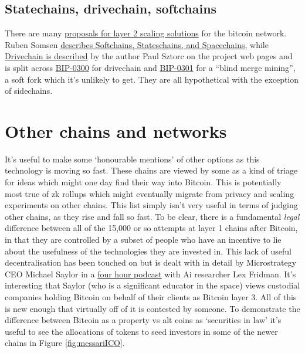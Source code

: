 \subsection{Statechains, drivechain, softchains} 
There are many \href{https://gist.github.com/RubenSomsen/96505e99dc061d6af6b757ff74434e70}{proposals for layer 2 scaling solutions} for the bitcoin network. Ruben Somsen \href{https://gist.github.com/RubenSomsen/c9f0a92493e06b0e29acced61ca9f49a}{describes Softchains, Stateschains, and Spacechains}, while  \href{https://www.drivechain.info/literature/index.html}{Drivechain is described} by the author Paul Sztorc on the project web pages and is split across \href{https://github.com/bitcoin/bips/blob/master/bip-0300.mediawiki}{BIP-0300} for drivechain and \href{https://github.com/bitcoin/bips/blob/master/bip-0301.mediawiki}{BIP-0301} for a ``blind merge mining'', a soft fork which it's unlikely to get. They are all hypothetical with the exception of sidechains.  

\section{Other chains and networks}
It's useful to make some `honourable mentions' of other options as this technology is moving so fast. These chains are viewed by some as a kind of triage for ideas which might one day find their way into Bitcoin. This is potentially most true of zk rollups which might eventually migrate from privacy and scaling experiments on other chains. This list simply isn't very useful in terms of judging other chains, as they rise and fall so fast. To be clear, there is a fundamental \textit{legal} difference between all of the 15,000 or so attempts at layer 1 chains after Bitcoin, in that they are controlled by a subset of people who have an incentive to lie about the usefulness of the technologies they are invested in. This lack of useful decentralisation has been touched on but is dealt with in detail by Microstrategy CEO Michael Saylor in a \href{https://www.youtube.com/watch?v=mC43pZkpTec}{four hour podcast} with Ai researcher Lex Fridman. It's interesting that Saylor (who is a significant educator in the space) views custodial companies holding Bitcoin on behalf of their clients as Bitcoin layer 3. All of this is new enough that virtually off of it is contested by someone. To demonstrate the difference between Bitcoin as a property vs alt coins as `securities in law' it's useful to see the allocations of tokens to seed investors in some of the newer chains in Figure \ref{fig:messariICO}.

